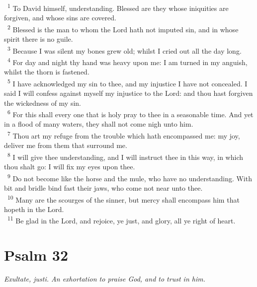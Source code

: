 \documentclass[a5paper,12pt]{article}
\begin{document}
\begin{multicols*}{2}
~\textsuperscript{1} To David himself, understanding. Blessed are they whose iniquities are forgiven, and whose sins are covered.\\
~\textsuperscript{2} Blessed is the man to whom the Lord hath not imputed sin, and in whose spirit there is no guile.\\
~\textsuperscript{3} Because I was silent my bones grew old; whilst I cried out all the day long.\\
~\textsuperscript{4} For day and night thy hand was heavy upon me: I am turned in my anguish, whilst the thorn is fastened.\\
~\textsuperscript{5} I have acknowledged my sin to thee, and my injustice I have not concealed. I said I will confess against myself my injustice to the Lord: and thou hast forgiven the wickedness of my sin.\\
~\textsuperscript{6} For this shall every one that is holy pray to thee in a seasonable time. And yet in a flood of many waters, they shall not come nigh unto him.\\
~\textsuperscript{7} Thou art my refuge from the trouble which hath encompassed me: my joy, deliver me from them that surround me.\\
~\textsuperscript{8} I will give thee understanding, and I will instruct thee in this way, in which thou shalt go: I will fix my eyes upon thee.\\
~\textsuperscript{9} Do not become like the horse and the mule, who have no understanding. With bit and bridle bind fast their jaws, who come not near unto thee.\\
~\textsuperscript{10} Many are the scourges of the sinner, but mercy shall encompass him that hopeth in the Lord.\\
~\textsuperscript{11} Be glad in the Lord, and rejoice, ye just, and glory, all ye right of heart.\\

\section{Psalm 32}
\label{sec:org8438792}
\emph{Exultate, justi. An exhortation to praise God, and to trust in him.}\\


\end{multicols*}
\end{document}
